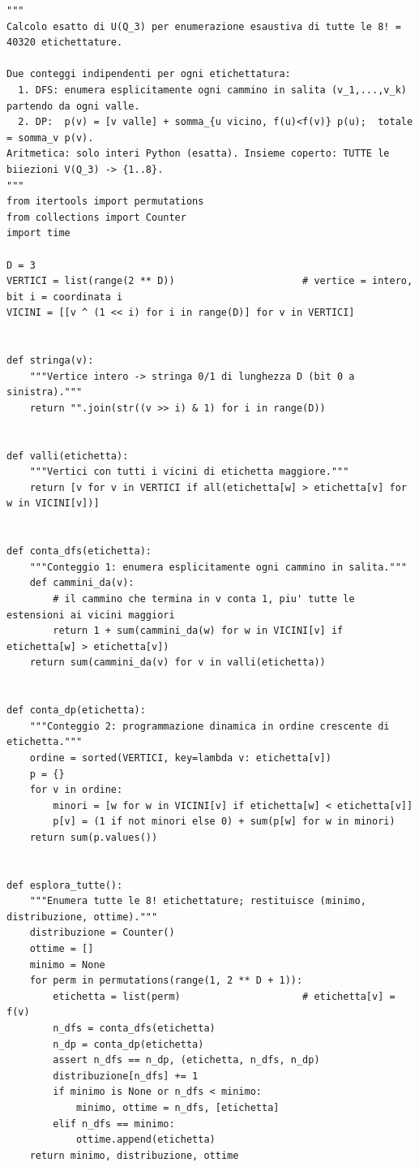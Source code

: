\documentclass[11pt,a4paper]{article}
\begin{document}
\begin{lstlisting}[caption={certificati/q3\_esaustivo.py}]
"""
Calcolo esatto di U(Q_3) per enumerazione esaustiva di tutte le 8! = 40320 etichettature.

Due conteggi indipendenti per ogni etichettatura:
  1. DFS: enumera esplicitamente ogni cammino in salita (v_1,...,v_k) partendo da ogni valle.
  2. DP:  p(v) = [v valle] + somma_{u vicino, f(u)<f(v)} p(u);  totale = somma_v p(v).
Aritmetica: solo interi Python (esatta). Insieme coperto: TUTTE le biiezioni V(Q_3) -> {1..8}.
"""
from itertools import permutations
from collections import Counter
import time

D = 3
VERTICI = list(range(2 ** D))                      # vertice = intero, bit i = coordinata i
VICINI = [[v ^ (1 << i) for i in range(D)] for v in VERTICI]


def stringa(v):
    """Vertice intero -> stringa 0/1 di lunghezza D (bit 0 a sinistra)."""
    return "".join(str((v >> i) & 1) for i in range(D))


def valli(etichetta):
    """Vertici con tutti i vicini di etichetta maggiore."""
    return [v for v in VERTICI if all(etichetta[w] > etichetta[v] for w in VICINI[v])]


def conta_dfs(etichetta):
    """Conteggio 1: enumera esplicitamente ogni cammino in salita."""
    def cammini_da(v):
        # il cammino che termina in v conta 1, piu' tutte le estensioni ai vicini maggiori
        return 1 + sum(cammini_da(w) for w in VICINI[v] if etichetta[w] > etichetta[v])
    return sum(cammini_da(v) for v in valli(etichetta))


def conta_dp(etichetta):
    """Conteggio 2: programmazione dinamica in ordine crescente di etichetta."""
    ordine = sorted(VERTICI, key=lambda v: etichetta[v])
    p = {}
    for v in ordine:
        minori = [w for w in VICINI[v] if etichetta[w] < etichetta[v]]
        p[v] = (1 if not minori else 0) + sum(p[w] for w in minori)
    return sum(p.values())


def esplora_tutte():
    """Enumera tutte le 8! etichettature; restituisce (minimo, distribuzione, ottime)."""
    distribuzione = Counter()
    ottime = []
    minimo = None
    for perm in permutations(range(1, 2 ** D + 1)):
        etichetta = list(perm)                     # etichetta[v] = f(v)
        n_dfs = conta_dfs(etichetta)
        n_dp = conta_dp(etichetta)
        assert n_dfs == n_dp, (etichetta, n_dfs, n_dp)
        distribuzione[n_dfs] += 1
        if minimo is None or n_dfs < minimo:
            minimo, ottime = n_dfs, [etichetta]
        elif n_dfs == minimo:
            ottime.append(etichetta)
    return minimo, distribuzione, ottime



\end{lstlisting}
\end{document}
